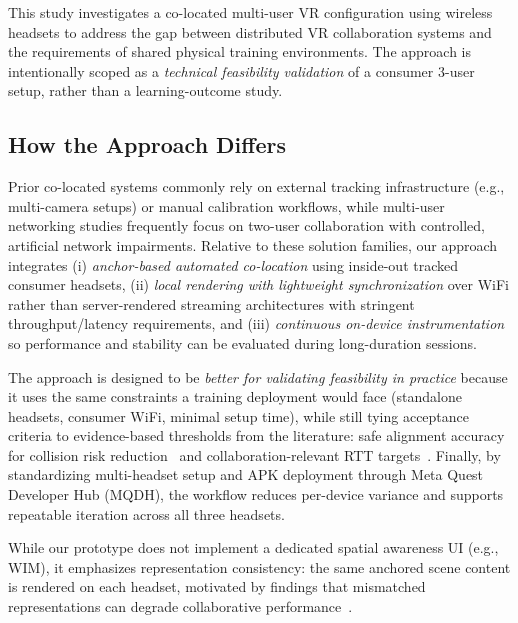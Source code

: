 \documentclass[conference]{IEEEtran}
\begin{document}
This study investigates a co-located multi-user VR configuration using wireless headsets to address the gap between distributed VR collaboration systems and the requirements of shared physical training environments. The approach is intentionally scoped as a \emph{technical feasibility validation} of a consumer 3-user setup, rather than a learning-outcome study.

\subsection{How the Approach Differs}
Prior co-located systems commonly rely on external tracking infrastructure (e.g., multi-camera setups) or manual calibration workflows, while multi-user networking studies frequently focus on two-user collaboration with controlled, artificial network impairments. Relative to these solution families, our approach integrates (i) \emph{anchor-based automated co-location} using inside-out tracked consumer headsets, (ii) \emph{local rendering with lightweight synchronization} over WiFi rather than server-rendered streaming architectures with stringent throughput/latency requirements, and (iii) \emph{continuous on-device instrumentation} so performance and stability can be evaluated during long-duration sessions.

The approach is designed to be \emph{better for validating feasibility in practice} because it uses the same constraints a training deployment would face (standalone headsets, consumer WiFi, minimal setup time), while still tying acceptance criteria to evidence-based thresholds from the literature: safe alignment accuracy for collision risk reduction~\cite{ReimerDennis2021CfSV} and collaboration-relevant RTT targets~\cite{VanDammeSam2024Iolo}. Finally, by standardizing multi-headset setup and APK deployment through Meta Quest Developer Hub (MQDH)\cite{MetaMQDHGettingStarted2025}, the workflow reduces per-device variance and supports repeatable iteration across all three headsets.

While our prototype does not implement a dedicated spatial awareness UI (e.g., WIM), it emphasizes representation consistency: the same anchored scene content is rendered on each headset, motivated by findings that mismatched representations can degrade collaborative performance~\cite{WeissYannick2025ItEo}.
\end{document}
